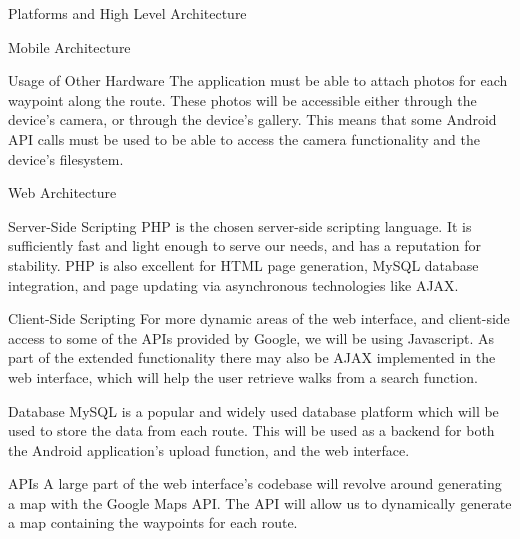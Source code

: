 \documentclass{article}
\begin{document}
\begin{section}{Platforms and High Level Architecture}
\begin{subsection}{Mobile Architecture}
			\begin{subsubsection}{Usage of Other Hardware}
				The application must be able to attach photos for each waypoint along the route. These photos will be accessible either through the device's camera, or through the device's gallery. This means that some Android API calls must be used to be able to access the camera functionality and the device's filesystem.
			\end{subsubsection}
		\end{subsection}
		
		\clearpage
		\begin{subsection}{Web Architecture}
			\begin{subsubsection}{Server-Side Scripting}
				PHP is the chosen server-side scripting language. It is sufficiently fast and light enough to serve our needs, and has a reputation for stability. PHP is also excellent for HTML page generation, MySQL database integration, and page updating via asynchronous technologies like AJAX.
			\end{subsubsection}
			
			\begin{subsubsection}{Client-Side Scripting}
				For more dynamic areas of the web interface, and client-side access to some of the APIs provided by Google, we will be using Javascript. As part of the extended functionality there may also be AJAX implemented in the web interface, which will help the user retrieve walks from a search function.
			\end{subsubsection}
			
			\begin{subsubsection}{Database}
				MySQL is a popular and widely used database platform which will be used to store the data from each route. This will be used as a backend for both the Android application's upload function, and the web interface.
			\end{subsubsection}			
			
			\begin{subsubsection}{APIs}
				A large part of the web interface's codebase will revolve around generating a map with the Google Maps API. The API will allow us to dynamically generate a map containing the waypoints for each route.
			\end{subsubsection}
		\end{subsection}
	\end{section}
	
\end{document}
